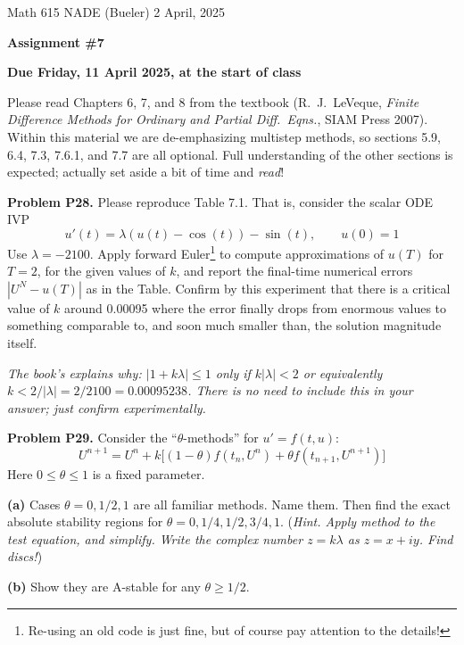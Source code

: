 \documentclass[12pt]{amsart}
\newcommand{\prob}[1]{\bigskip\noindent\textbf{#1}\quad }
\newcommand{\epart}[1]{\medskip\noindent\textbf{(#1)}\quad }
\begin{document}
\scriptsize \noindent Math 615 NADE (Bueler) \hfill 2 April, 2025
\normalsize

\medskip\bigskip

\Large\centerline{\textbf{Assignment \#7}}
\large
\bigskip

\centerline{\textbf{Due Friday, 11 April 2025, at the start of class}}
\bigskip
\normalsize

\thispagestyle{empty}

\bigskip
Please read Chapters 6, 7, and 8 from the textbook (R.~J.~LeVeque, \emph{Finite Difference Methods for Ordinary and Partial Diff.~Eqns.}, SIAM Press 2007).  Within this material we are de-emphasizing multistep methods, so sections 5.9, 6.4, 7.3, 7.6.1, and 7.7 are all optional.  Full understanding of the other sections is expected; actually set aside a bit of time and \emph{read}!

\medskip


\prob{Problem P28.}  Please reproduce Table 7.1.  That is, consider the scalar ODE IVP
	$$u'(t) = \lambda \left( u(t) - \cos(t) \right) - \sin(t), \qquad u(0)=1$$
Use $\lambda=-2100$.  Apply forward Euler\footnote{Re-using an old code is just fine, but of course pay attention to the details!} to compute approximations of $u(T)$ for $T=2$, for the given values of $k$, and report the final-time numerical errors $|U^N - u(T)|$ as in the Table.  Confirm by this experiment that there is a critical value of $k$ around 0.00095 where the error finally drops from enormous values to something comparable to, and soon much smaller than, the solution magnitude itself.

\medskip
\noindent \emph{The book's explains why: $|1+k\lambda| \le 1$ only if $k|\lambda|<2$ or equivalently $k < 2/|\lambda| = 2/2100 = 0.00095238$.  There is no need to include this in your answer; just confirm experimentally.}


\prob{Problem P29.}  Consider the ``$\theta$-methods'' for $u' = f(t,u)$:
   $$U^{n+1} = U^n + k\Big[(1-\theta)f(t_n,U^n) + \theta f(t_{n+1},U^{n+1})\Big]$$
Here $0\le \theta \le 1$ is a fixed parameter.

\epart{a} Cases $\theta = 0,1/2,1$ are all familiar methods.  Name them.  Then find the exact absolute stability regions for $\theta = 0,1/4,1/2,3/4,1$.  (\emph{Hint. Apply method to the test equation, and simplify.  Write the complex number $z=k\lambda$ as $z=x+iy$.  Find discs!})

\epart{b} Show they are A-stable for any $\theta \geq 1/2$.
\end{document}
